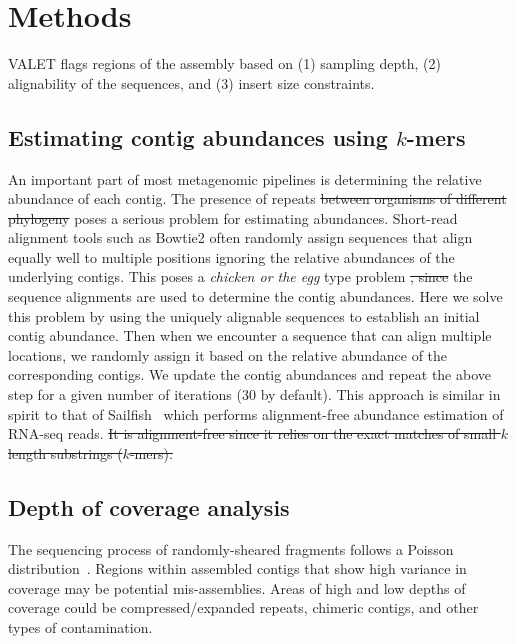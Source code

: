 \documentclass[12pt,\mydriver]{thesis}
\providecommand{\DIFaddtex}[1]{{\protect\color{blue}\uwave{#1}}} %
\providecommand{\DIFdeltex}[1]{{\protect\color{red}\sout{#1}}}                      %
\providecommand{\DIFaddbegin}{} %
\providecommand{\DIFaddend}{} %
\providecommand{\DIFdelbegin}{} %
\providecommand{\DIFdelend}{} %
\providecommand{\DIFadd}[1]{\texorpdfstring{\DIFaddtex{#1}}{#1}} %
\providecommand{\DIFdel}[1]{\texorpdfstring{\DIFdeltex{#1}}{}} %
\begin{document}
\section{Methods}
VALET flags regions of the assembly based on (1) sampling depth, (2) alignability of the sequences, and (3) insert size constraints.

\subsection{Estimating contig abundances using $k$-mers}

An important part of most metagenomic pipelines is determining the relative abundance of each contig.
The presence of repeats \DIFdelbegin \DIFdel{between organisms of different phylogeny }\DIFdelend \DIFaddbegin \DIFadd{among different species }\DIFaddend poses a serious problem for estimating abundances.
Short-read alignment tools such as Bowtie2 often randomly assign sequences that align equally well to multiple positions ignoring the relative abundances of the underlying contigs.
This poses a \emph{chicken or the egg} type problem \DIFdelbegin \DIFdel{, since }\DIFdelend \DIFaddbegin \DIFadd{because }\DIFaddend the sequence alignments are used to determine the contig abundances.
Here we solve this problem by using the uniquely alignable sequences to establish an initial contig abundance.
Then when we encounter a sequence that can align multiple locations, we randomly assign it based on the relative abundance of the corresponding contigs.
We update the contig abundances and repeat the above step for a given number of iterations (30 by default).
This approach is similar in spirit to that of Sailfish~\cite{patro2014sailfish} which performs alignment-free abundance estimation of RNA-seq reads.
\DIFdelbegin \DIFdel{It is alignment-free since it relies on the exact matches of small $k$ length substrings ($k$-mers).
}\DIFdelend 

\subsection{Depth of coverage analysis}
The sequencing process of randomly-sheared fragments follows a Poisson distribution~\cite{lander1988genomic}.  Regions within assembled contigs that show high variance in coverage may be potential mis-assemblies.  Areas of high and low depths of coverage could be compressed/expanded repeats, chimeric contigs, and other types of contamination.
\end{document}
